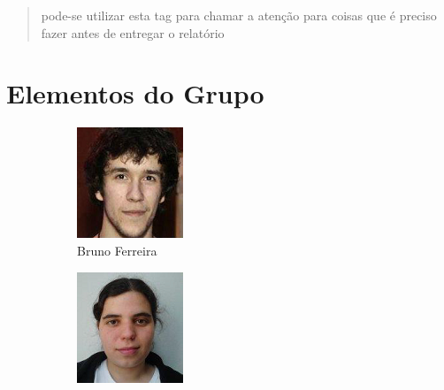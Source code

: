 \documentclass[11pt, a4paper, oneside]{article}
\newcommand{\todo}[1] {\textcolor{BrickRed}{\begin{quote}#1\end{quote}}}
\begin{document}
\newpage

\todo{pode-se utilizar esta tag para chamar a atenção para coisas que é preciso fazer antes de entregar o relatório}

\newpage
\section{Elementos do Grupo}
\begin{figure}[h!]
\centering
\begin{subfigure}{.33\textwidth}
  \centering
  \includegraphics[width=0.8\linewidth]{60}
  \caption{Bruno Ferreira  }
\end{subfigure}%
\begin{subfigure}{.33\textwidth}
  \centering
  \includegraphics[width=0.8\linewidth]{107}

\end{subfigure}
\end{figure}
\end{document}
